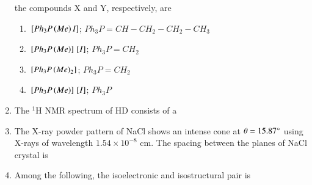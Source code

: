\documentclass[journal,12pt,onecolumn]{IEEEtran}
\theoremstyle{remark}
\begin{document}
\begin{enumerate}[resume]
 the compounds X and Y, respectively, are
    \begin{enumerate}
        \item ${}\left[Ph_3P\left(Me\right)I\right]$;
 $Ph_3P=CH-CH_2-CH_2-CH_3$
        \item ${}\left[Ph_3P\left(Me\right)\right]{}\left[I\right]$; $Ph_3P=CH_2$
        \item ${}\left[Ph_3P\left(Me\right)_2\right]$;
 $Ph_3P=CH_2$
        \item ${}\left[Ph_3P\left(Me\right)\right]{}\left[I\right]$;
 $Ph_3P$
        \hfill{}
    \end{enumerate}



\item The $^1$H NMR spectrum of HD consists of a
    \begin{enumerate}
        \hfill{}
    \end{enumerate}



\item The X-ray powder pattern of 
 NaCl shows an intense cone at $\theta = 15.87\degree$ using X-rays of wavelength $1.54 \times 10^{-8}$ cm.
 The spacing between the planes  of NaCl crystal is
    \begin{enumerate}
        \hfill{}
    \end{enumerate}



\item Among the following, the isoelectronic and isostructural pair is
    \begin{enumerate}
        
        \hfill{}
    \end{enumerate}




\end{enumerate}
\end{document}
